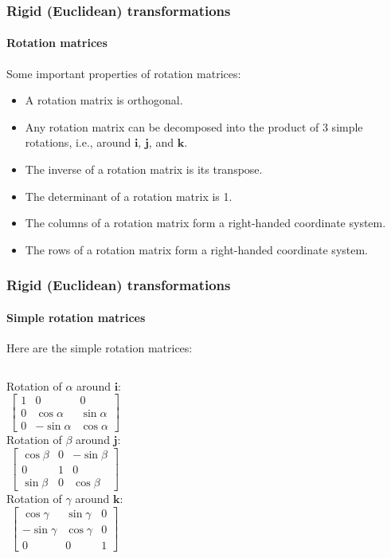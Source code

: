\documentclass[aspectratio=169]{beamer}
\renewcommand{\vec}[1]{\boldsymbol{#1}}
\begin{document}
\begin{frame}
\frametitle{Rigid (Euclidean) transformations}
\framesubtitle{Rotation matrices}

Some important properties of rotation matrices:
\begin{itemize}
\item A rotation matrix is \alert{orthogonal}.
\item Any rotation matrix can be decomposed into the \alert{product of
  3 simple rotations}, i.e., around $\vec{i}$, $\vec{j}$, and
  $\vec{k}$.
\item The \alert{inverse} of a rotation matrix is its
  \alert{transpose}.
\item The \alert{determinant} of a rotation matrix is 1.
\item The \alert{columns} of a rotation matrix form a right-handed
  coordinate system.
\item The \alert{rows} of a rotation matrix form a right-handed
  coordinate system.
\end{itemize}

\end{frame}


\begin{frame}
\frametitle{Rigid (Euclidean) transformations}
\framesubtitle{Simple rotation matrices}

Here are the simple rotation matrices:

\medskip

\begin{columns}
\column{1.5in}
Rotation of $\alpha$ around $\vec{i}$:
\begin{equation*}
\begin{bmatrix}
1 & 0 & 0 \\
0 & \cos \alpha & \sin \alpha \\
0 & -\sin \alpha & \cos \alpha
\end{bmatrix}
\end{equation*}
\column{1.5in}
Rotation of $\beta$ around $\vec{j}$:
\begin{equation*}
\begin{bmatrix}
\cos \beta & 0 & -\sin \beta \\
0 & 1 & 0 \\
\sin \beta & 0 & \cos \beta
\end{bmatrix}
\end{equation*}
\column{1.5in}
Rotation of $\gamma$ around $\vec{k}$:
\begin{equation*}
\begin{bmatrix}
\cos \gamma & \sin \gamma & 0 \\
-\sin \gamma & \cos \gamma & 0 \\
0 & 0 & 1
\end{bmatrix}
\end{equation*}
\end{columns}

\end{frame}
\end{document}
